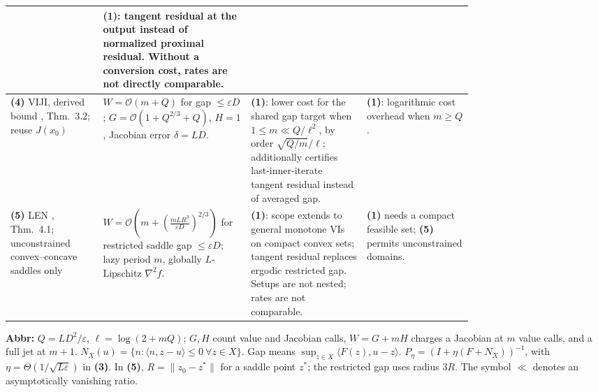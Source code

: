 \begin{table}[tp]
\begin{threeparttable}
\begin{tabularx}{\linewidth}{@{}>{\raggedright\arraybackslash}p{0.20\linewidth}>{\raggedright\arraybackslash}p{0.32\linewidth}>{\raggedright\arraybackslash}p{0.25\linewidth}>{\raggedright\arraybackslash}X@{}}
& \textbf{(1)}: tangent residual at the output instead of normalized proximal residual. Without a conversion cost, rates are not directly comparable.
& \\
\midrule
\textbf{(4)} VIJI, derived bound \citep{ljmAgafonov2024VIJI}, Thm.~3.2; reuse $J(x_0)$
& $W=\mathcal{O}(m+Q)$ for gap $\le\varepsilon D$; $G=\mathcal{O}(1+Q^{2/3}+Q)$, $H=1$, Jacobian error $\delta=LD$.
& \textbf{(1)}: lower cost for the shared gap target when $1\le m\ll Q/\ell^2$, by order $\sqrt{Q/m}/\ell$; additionally certifies last-inner-iterate tangent residual instead of averaged gap.
& \textbf{(1)}: logarithmic cost overhead when $m\ge Q$. \\
\midrule
\textbf{(5)} LEN \citep{ljmChen2025LazyV2}, Thm.~4.1; unconstrained convex--concave saddles only
& $W=\mathcal{O}\!\left(m+\left(\frac{mLR^3}{\varepsilon D}\right)^{2/3}\right)$ for restricted saddle gap $\le\varepsilon D$; lazy period $m$, globally $L$-Lipschitz $\nabla^2 f$.
& \textbf{(1)}: scope extends to general monotone VIs on compact convex sets; tangent residual replaces ergodic restricted gap. Setups are not nested; rates are not comparable.
& \textbf{(1)} needs a compact feasible set; \textbf{(5)} permits unconstrained domains. \\
\bottomrule
\end{tabularx}
\begin{tablenotes}[flushleft]\footnotesize
\item[] \textbf{Abbr:} $Q=LD^2/\varepsilon$, $\ell=\log(2+mQ)$; $G,H$ count value and Jacobian calls, $W=G+mH$ charges a Jacobian at $m$ value calls, and a full jet at $m+1$. $N_X(u)=\{n:\langle n,z-u\rangle\le0\ \forall z\in X\}$. Gap means $\sup_{z\in X}\langle F(z),u-z\rangle$. $P_\eta=(I+\eta(F+N_X))^{-1}$, with $\eta=\Theta(1/\sqrt{L\varepsilon})$ in \textbf{(3)}. In \textbf{(5)}, $R=\|z_0-z^*\|$ for a saddle point $z^*$; the restricted gap uses radius $3R$. The symbol $\ll$ denotes an asymptotically vanishing ratio.
\end{tablenotes}
\end{threeparttable}
\end{table}
